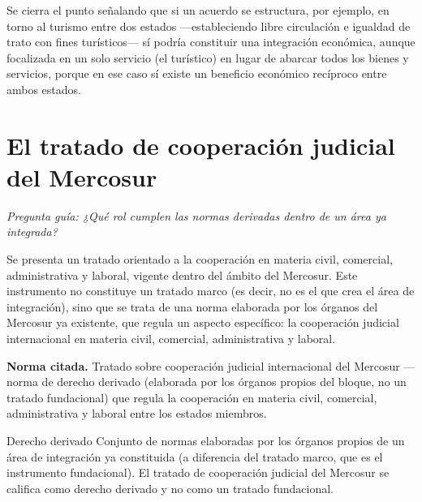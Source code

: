 \documentclass[12pt,oneside]{book}
\begin{document}
Se cierra el punto señalando que si un acuerdo se estructura, por ejemplo, en torno al turismo entre dos estados —estableciendo libre circulación e igualdad de trato con fines turísticos— sí podría constituir una integración económica, aunque focalizada en un solo servicio (el turístico) en lugar de abarcar todos los bienes y servicios, porque en ese caso sí existe un beneficio económico recíproco entre ambos estados.

\section{El tratado de cooperación judicial del Mercosur}

\textit{Pregunta guía: ¿Qué rol cumplen las normas derivadas dentro de un área ya integrada?}

Se presenta un tratado orientado a la cooperación en materia civil, comercial, administrativa y laboral, vigente dentro del ámbito del Mercosur. Este instrumento no constituye un tratado marco (es decir, no es el que crea el área de integración), sino que se trata de una norma elaborada por los órganos del Mercosur ya existente, que regula un aspecto específico: la cooperación judicial internacional en materia civil, comercial, administrativa y laboral.

\begin{important}
\textbf{Norma citada.} Tratado sobre cooperación judicial internacional del Mercosur — norma de derecho derivado (elaborada por los órganos propios del bloque, no un tratado fundacional) que regula la cooperación en materia civil, comercial, administrativa y laboral entre los estados miembros.
\end{important}

\begin{definition}{Derecho derivado}
Conjunto de normas elaboradas por los órganos propios de un área de integración ya constituida (a diferencia del tratado marco, que es el instrumento fundacional). El tratado de cooperación judicial del Mercosur se califica como derecho derivado y no como un tratado fundacional.
\end{definition}
\end{document}
